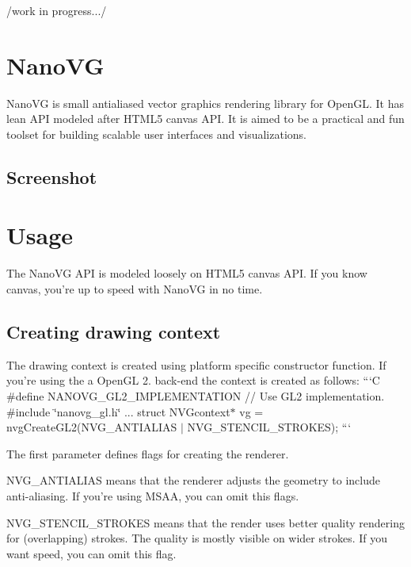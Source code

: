 /work in progress.../

\section*{Nano\+V\+G }

Nano\+V\+G is small antialiased vector graphics rendering library for Open\+G\+L. It has lean A\+P\+I modeled after H\+T\+M\+L5 canvas A\+P\+I. It is aimed to be a practical and fun toolset for building scalable user interfaces and visualizations.

\subsection*{Screenshot}



\section*{Usage }

The Nano\+V\+G A\+P\+I is modeled loosely on H\+T\+M\+L5 canvas A\+P\+I. If you know canvas, you're up to speed with Nano\+V\+G in no time.

\subsection*{Creating drawing context}

The drawing context is created using platform specific constructor function. If you're using the a Open\+G\+L 2. back-\/end the context is created as follows\+: ```\+C \#define N\+A\+N\+O\+V\+G\+\_\+\+G\+L2\+\_\+\+I\+M\+P\+L\+E\+M\+E\+N\+T\+A\+T\+I\+O\+N // Use G\+L2 implementation. \#include \char`\"{}nanovg\+\_\+gl.\+h\char`\"{} ... struct N\+V\+Gcontext$\ast$ vg = nvg\+Create\+G\+L2(N\+V\+G\+\_\+\+A\+N\+T\+I\+A\+L\+I\+A\+S $\vert$ N\+V\+G\+\_\+\+S\+T\+E\+N\+C\+I\+L\+\_\+\+S\+T\+R\+O\+K\+E\+S); ```

The first parameter defines flags for creating the renderer.


\begin{DoxyItemize}
\item {\ttfamily N\+V\+G\+\_\+\+A\+N\+T\+I\+A\+L\+I\+A\+S} means that the renderer adjusts the geometry to include anti-\/aliasing. If you're using M\+S\+A\+A, you can omit this flags.
\item {\ttfamily N\+V\+G\+\_\+\+S\+T\+E\+N\+C\+I\+L\+\_\+\+S\+T\+R\+O\+K\+E\+S} means that the render uses better quality rendering for (overlapping) strokes. The quality is mostly visible on wider strokes. If you want speed, you can omit this flag.
\end{DoxyItemize}

